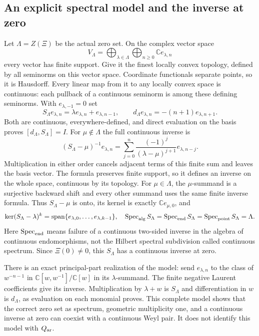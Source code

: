 \subsection{An explicit spectral model and the inverse at zero}

Let $\Lambda=Z(\Xi)$ be the actual zero set. On the complex
vector space
\[
 V_\Lambda=\bigoplus_{\lambda\in\Lambda}
                   \bigoplus_{n\geq0}\mathbb C e_{\lambda,n}
\]
every vector has finite support. Give it the finest locally
convex topology, defined by all seminorms on this vector space.
Coordinate functionals separate points, so it is Hausdorff.
Every linear map from it to any locally convex space is
continuous: each pullback of a continuous seminorm is among
these defining seminorms.
With $e_{\lambda,-1}=0$ set
\[
 S_\Lambda e_{\lambda,n}=\lambda e_{\lambda,n}+e_{\lambda,n-1},
 \qquad d_\Lambda e_{\lambda,n}=-(n+1)e_{\lambda,n+1}.
\]
Both are continuous, everywhere-defined, and direct evaluation
on the basis proves $[d_\Lambda,S_\Lambda]=I$.
For $\mu\notin\Lambda$ the full continuous inverse is
\begin{equation}
 (S_\Lambda-\mu)^{-1}e_{\lambda,n}
 =\sum_{j=0}^n
       \frac{(-1)^j}{(\lambda-\mu)^{j+1}}e_{\lambda,n-j}.
 \label{eq:cq-source-model-resolvent}
\end{equation}
Multiplication in either order cancels adjacent terms of
this finite sum and leaves the basis vector. The formula
preserves finite support, so it defines an inverse on
the whole space, continuous by its topology.
For $\mu\in\Lambda$, the $\mu$-summand is a surjective
backward shift and every other summand uses the same finite
inverse formula. Thus $S_\Lambda-\mu$ is onto, its kernel
is exactly $\mathbb C e_{\mu,0}$, and
\begin{equation}
 \ker(S_\Lambda-\lambda)^k
   =\operatorname{span}\{e_{\lambda,0},\ldots,e_{\lambda,k-1}\},
 \quad
 \operatorname{Spec}_{\rm alg}S_\Lambda
  =\operatorname{Spec}_{\rm end}S_\Lambda
  =\operatorname{Spec}_{\rm point}S_\Lambda=\Lambda .
 \label{eq:cq-source-model-spectrum}
\end{equation}
Here $\operatorname{Spec}_{\rm end}$ means failure of a
continuous two-sided inverse in the algebra of continuous
endomorphisms, not the Hilbert spectral subdivision called
continuous spectrum. Since $\Xi(0)\ne0$, this $S_\Lambda$
has a continuous inverse at zero.

There is an exact principal-part realization of the model:
send $e_{\lambda,n}$ to the class of $w^{-n-1}$ in
$\mathbb C[w,w^{-1}]/\mathbb C[w]$ in its $\lambda$-summand.
The finite negative Laurent coefficients give its inverse.
Multiplication by $\lambda+w$ is $S_\Lambda$ and
differentiation in $w$ is $d_\Lambda$, as evaluation on
each monomial proves.
This complete model shows that the correct zero set as
spectrum, geometric multiplicity one, and a continuous
inverse at zero can coexist with a continuous Weyl pair.
It does not identify this model with $Q_{\rm ar}$.

